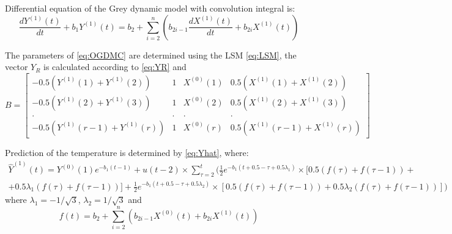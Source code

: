 \documentclass[AMS,STIX2COL]{WileyNJD-v2}
\begin{document}
Differential equation of the Grey dynamic model with convolution integral is:
\begin{equation} \label{eq:OGDMC}
\frac{dY^{(1)}(t)}{dt}+b_1Y^{(1)}(t)
=b_2+\sum_{i=2}^{n}\left(b_{2i-1}\frac{dX^{(1)}(t)}{dt}+b_{2i}X^{(1)}(t)\right)
\end{equation}

The parameters of \eqref{eq:OGDMC} are determined using the LSM \eqref{eq:LSM}, the vector $Y_R$ is calculated according to \eqref{eq:YR} and
\begin{equation}
B = \begin{bmatrix}
-0.5\left(Y^{(1)}(1)+Y^{(1)}(2)\right) &1&X^{(0)}(1)& 0.5\left(X^{(1)}(1)+X^{(1)}(2)\right)   \\ 
-0.5\left(Y^{(1)}(2)+Y^{(1)}(3)\right) &1&X^{(0)}(2)&  0.5\left(X^{(1)}(2)+X^{(1)}(3)\right) \\
. & . & . & .\\
-0.5\left(Y^{(1)}(r-1)+Y^{(1)}(r)\right)&1&X^{(0)}(r)&  0.5\left(X^{(1)}(r-1)+X^{(1)}(r)\right) 
\end{bmatrix}
\end{equation}

Prediction of the temperature is determined by \eqref{eq:Yhat}, where:
\begin{align}
\hat{Y}^{(1)}(t)=Y^{(0)}(1)e^{-b_1(t-1)} + u(t-2) \times  \sum_{\tau=2}^{t}(\frac{1}{2}e^{-b_1(t+0.5-\tau+0.5\lambda_1)}\times
[0.5\left( f(\tau)+f(\tau-1) \right) + \nonumber\\
+0.5\lambda_1\left( f(\tau)+f(\tau-1) \right) ]+\frac{1}{2}e^{-b_1(t+0.5-\tau+0.5\lambda_2)}
\times[0.5\left( f(\tau)+f(\tau-1) \right) + 0.5\lambda_2\left( f(\tau)+f(\tau-1) \right) ]  )\
\end{align}
where $\lambda_1 = -1/\sqrt{3}$, $\lambda_2 = 1/\sqrt{3}$ and
\begin{equation}
f(t) = b_2 + \sum_{i=2}^{n}\left(b_{2i-1}X^{(0)}(t)+b_{2i}X^{(1)}(t)\right)
\end{equation}
\end{document}

